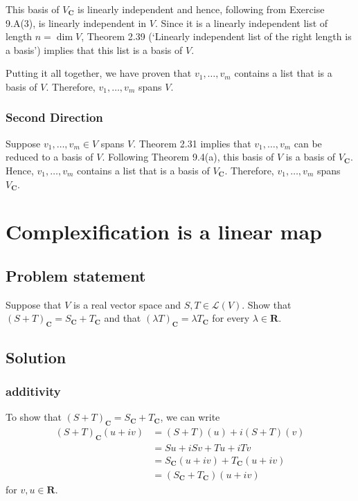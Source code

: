 \documentclass{article}
\begin{document}
This basis of $V_{\mathbf{C}}$ is linearly independent and hence, following from Exercise 9.A(3), is linearly independent in $V$. 
Since it is a linearly independent list of length $n=\operatorname{dim}V$, Theorem 2.39 (`Linearly independent list of the right length is a basis') implies that this list is a basis of $V$.

Putting it all together, we have proven that $v_1,\ldots,v_m$ contains a list that is a basis of $V$. 
Therefore, $v_1,\ldots,v_m$ spans $V$.

\subsubsection*{Second Direction}
Suppose $v_1,\ldots,v_m\in V$ spans $V$. 
Theorem 2.31 implies that $v_1,\ldots,v_m$ can be reduced to a basis of $V$. 
Following Theorem 9.4(a), this basis of $V$ is a basis of $V_{\mathbf{C}}$. 
Hence, $v_1,\ldots,v_m$ contains a list that is a basis of $V_{\mathbf{C}}$. 
Therefore, $v_1,\ldots,v_m$ spans $V_{\mathbf{C}}$. 

\clearpage

\section{Complexification is a linear map}
\subsection*{Problem statement}
Suppose that $V$ is a real vector space and $S,T\in\mathcal{L}(V)$. 
Show that \newline
$(S+T)_{\mathbf{C}}=S_{\mathbf{C}}+T_{\mathbf{C}}$ and that $(\lambda T)_{\mathbf{C}}=\lambda T_{\mathbf{C}}$ for every $\lambda\in\mathbf{R}$.

\subsection*{Solution}
\subsubsection*{additivity}
To show that $(S+T)_{\mathbf{C}}=S_{\mathbf{C}}+T_{\mathbf{C}}$, we can write
\begin{align*}
    (S+T)_{\mathbf{C}}(u+iv)&=(S+T)(u)+i(S+T)(v)\\
    &=Su+iSv+Tu+iTv\\
    &=S_{\mathbf{C}}(u+iv)+T_{\mathbf{C}}(u+iv)\\
    &=(S_{\mathbf{C}}+T_{\mathbf{C}})(u+iv)
\end{align*}
for $v,u\in\mathbf{R}$.
\end{document}
